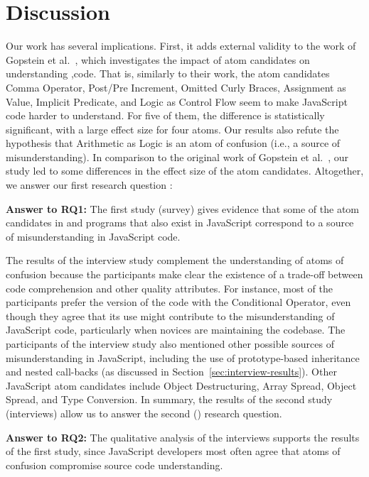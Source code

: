 \section{Discussion}
\label{sec:discussion}

Our work has several implications.
First, it adds external validity to the
work of Gopstein et al.~\cite{DBLP:conf/sigsoft/GopsteinIYDZYC17},
which investigates
the impact of atom candidates on
understanding \clang,\cpplang code. That is,
similarly to their work, the atom candidates
Comma Operator, Post/Pre Increment, Omitted Curly Braces,
Assignment as Value, Implicit Predicate, and Logic as
Control Flow seem to make 
JavaScript code harder to understand. For five of them, the difference is statistically significant, with a large effect size for four atoms. Our results also 
refute the hypothesis that Arithmetic as Logic is an atom of confusion (i.e., a source of misunderstanding).
In comparison to the original
work of Gopstein et al.~\cite{DBLP:conf/sigsoft/GopsteinIYDZYC17}, 
our study
led to some differences in the effect size
of the atom candidates.
Altogether, we answer our first research question
\emph{\rqa}:

\begin{mh}
  {\bf Answer to RQ1:} The first study (survey) gives evidence that some of the atom candidates in \clang and \cpplang programs that also exist in JavaScript correspond to a source of misunderstanding in
  JavaScript code. 
\end{mh}

The results of the interview study complement the understanding of atoms of confusion because the participants make clear the existence of a trade-off between code comprehension and other quality attributes. For instance, most of the participants prefer the version of the code with the Conditional Operator, even though they agree that its use might contribute to the misunderstanding of JavaScript code, particularly when novices are maintaining the codebase. The participants of the interview study also
mentioned other possible sources of misunderstanding in JavaScript,
including the use of prototype-based inheritance and nested call-backs (as discussed in Section~\ref{sec:interview-results}). Other JavaScript atom candidates include
Object Destructuring, Array Spread, Object Spread, and Type Conversion.
In summary, the results of the second study (interviews) allow
us to answer the second (\rqb) research question.

\begin{mh}
  {\bf Answer to RQ2:} The qualitative analysis of the
  interviews supports the results of the first study,
  since JavaScript developers most often agree that atoms of confusion compromise
  source code understanding. 
\end{mh}

